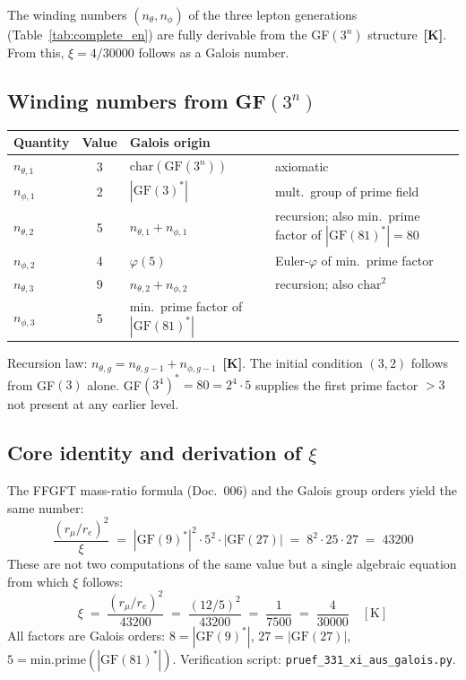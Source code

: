 The winding numbers $(n_\theta, n_\phi)$ of the three lepton generations
(Table~\ref{tab:complete_en}) are fully derivable from the GF$(3^n)$
structure~\textbf{[K]}. From this, $\xi = 4/30000$ follows as a Galois number.

\subsection*{Winding numbers from GF$(3^n)$}

\begin{center}
\begin{tabular}{lcll}
\toprule
Quantity & Value & Galois origin & \\
\midrule
$n_{\theta,1}$ & 3 & $\text{char}(\text{GF}(3^n))$ & axiomatic \\
$n_{\phi,1}$   & 2 & $|\text{GF}(3)^*|$ & mult.\ group of prime field \\
$n_{\theta,2}$ & 5 & $n_{\theta,1}+n_{\phi,1}$ & recursion; also min.\ prime factor of $|\text{GF}(81)^*|=80$ \\
$n_{\phi,2}$   & 4 & $\varphi(5)$ & Euler-$\varphi$ of min.\ prime factor \\
$n_{\theta,3}$ & 9 & $n_{\theta,2}+n_{\phi,2}$ & recursion; also $\text{char}^2$ \\
$n_{\phi,3}$   & 5 & min.\ prime factor of $|\text{GF}(81)^*|$ & \\
\bottomrule
\end{tabular}
\end{center}

Recursion law: $n_{\theta,g} = n_{\theta,g-1} + n_{\phi,g-1}$~\textbf{[K]}.
The initial condition $(3,2)$ follows from GF$(3)$ alone.
GF$(3^4)^* = 80 = 2^4 \cdot 5$ supplies the first prime factor $>3$
not present at any earlier level.

\subsection*{Core identity and derivation of $\xi$}

The FFGFT mass-ratio formula (Doc.~006) and the Galois group orders
yield the same number:
\begin{equation}
  \frac{(r_\mu/r_e)^2}{\xi}
  \;=\;
  |\text{GF}(9)^*|^2 \cdot 5^2 \cdot |\text{GF}(27)|
  \;=\; 8^2 \cdot 25 \cdot 27
  \;=\; 43200
  \label{eq:xi_galois}
\end{equation}
These are not two computations of the same value but a single
algebraic equation from which $\xi$ follows:
\begin{equation}
  \xi \;=\; \frac{(r_\mu/r_e)^2}{43200}
  \;=\; \frac{(12/5)^2}{43200}
  \;=\; \frac{1}{7500}
  \;=\; \frac{4}{30000}
  \quad [\text{K}]
\end{equation}
All factors are Galois orders:
$8=|\text{GF}(9)^*|$, $27=|\text{GF}(27)|$,
$5=\text{min.prime}(|\text{GF}(81)^*|)$.
Verification script: \texttt{pruef\_331\_xi\_aus\_galois.py}.

